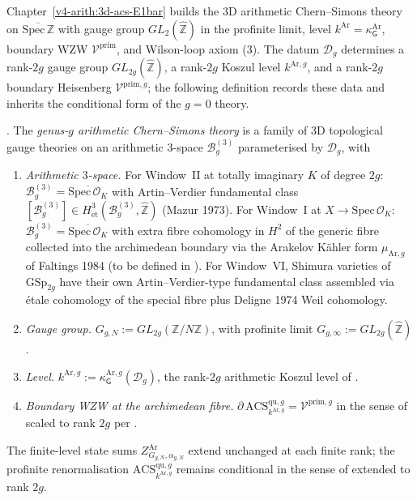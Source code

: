 Chapter~\ref{v4-arith:3d-acs-E1bar} builds the 3D arithmetic
Chern--Simons theory on \(\overline{\mathrm{Spec}\,\mathbb{Z}}\) with
gauge group \(GL_{2}(\widehat{\mathbb{Z}})\) in the profinite limit,
level \(k^{\mathrm{Ar}}=\kappa^{\mathrm{Ar}}_{\mathsf{G}}\), boundary WZW
\(\mathcal{V}^{\mathrm{prim}}\), and Wilson-loop axiom
(3). The datum \(\mathcal{D}_{g}\) determines
a rank-\(2g\) gauge group \(GL_{2g}(\widehat{\mathbb{Z}})\), a rank-\(2g\)
Koszul level \(k^{\mathrm{Ar},g}\), and a rank-\(2g\) boundary Heisenberg
\(\mathcal{V}^{\mathrm{prim},g}\); the following definition records these data
and inherits the conditional form of the \(g=0\) theory.

\begin{definition}
\label{v4-arith:w9-r6:def:acs-g}
\ClaimStatusDefinitional. The \emph{genus-\(g\) arithmetic Chern--Simons
theory} is a family of 3D topological gauge theories on an arithmetic
\(3\)-space \(\mathcal{B}_{g}^{(3)}\) parameterised by
\(\mathcal{D}_{g}\), with
\begin{enumerate}
\item \emph{Arithmetic \(3\)-space.} For Window~II at totally imaginary
\(K\) of degree \(2g\):
\(\mathcal{B}_{g}^{(3)}=\overline{\mathrm{Spec}\,\mathcal{O}_{K}}\) with
Artin--Verdier fundamental class
\([\mathcal{B}_{g}^{(3)}]\in H^{3}_{\mathrm{\acute{e}t}}(\mathcal{B}_{g}^{(3)},\widehat{\mathbb{Z}})\)
(Mazur 1973). For Window~I at \(X\to\mathrm{Spec}\,\mathcal{O}_{K}\):
\(\mathcal{B}_{g}^{(3)}=\overline{\mathrm{Spec}\,\mathcal{O}_{K}}\) with
extra fibre cohomology in \(H^{2}\) of the generic fibre collected into
the archimedean boundary via the Arakelov K\"ahler form
\(\mu_{\mathrm{Ar},g}\) of Faltings 1984 (to be defined in
). For Window~VI, Shimura varieties
of \(\mathrm{GSp}_{2g}\) have their own Artin--Verdier-type fundamental
class assembled via \'etale cohomology of the special fibre plus
Deligne 1974 Weil cohomology.
\item \emph{Gauge group.}
\(G_{g,N}:=GL_{2g}(\mathbb{Z}/N\mathbb{Z})\), with profinite limit
\(G_{g,\infty}:=GL_{2g}(\widehat{\mathbb{Z}})\).
\item \emph{Level.}
\(k^{\mathrm{Ar},g}:=\kappa^{\mathrm{Ar},g}_{\mathsf{G}}(\mathcal{D}_{g})\),
the rank-\(2g\) arithmetic Koszul level of
.
\item \emph{Boundary WZW at the archimedean fibre.}
\(\partial\,\mathrm{ACS}^{\mathrm{qu},g}_{k^{\mathrm{Ar},g}}=\mathcal{V}^{\mathrm{prim},g}\)
in the sense of
 scaled to rank \(2g\) per
.
\end{enumerate}
The finite-level state sums
\(Z^{\mathrm{Ar}}_{G_{g,N},\alpha_{g,N}}\) extend
 unchanged at each finite
rank; the profinite renormalisation
\(\mathrm{ACS}^{\mathrm{qu},g}_{k^{\mathrm{Ar},g}}\) remains conditional
in the sense of  extended to rank
\(2g\).
\end{definition}

